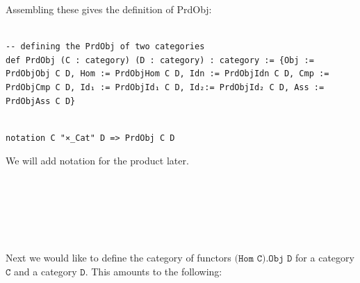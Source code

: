 \documentclass{book}
\newcounter{lcounter}
\newcounter{sectioncount}
\newcounter{subsectioncount}
\renewcommand{\section}[1]{\newpage
\ \\
\ \\
 \begin{center} \scalebox{1.5}{\texttt{\thesectioncount . #1}} \setcounter{sectioncount}{\thesectioncount+1} \setcounter{subsectioncount}{1} \end{center}
 \begin{center}

\ \\
\ \\

\thispagestyle{empty}
\end{center}
}
\begin{document}
Assembling these gives the definition of PrdObj:\\
 
\begin{center}
\begin{tcolorbox}[width=5in,colback={white},title={\begin{center}\texttt{Lean \thelcounter} \addtocounter{lcounter}{1}  \end{center}},colbacktitle=Blue,coltitle=black]
\begin{verbatim}

-- defining the PrdObj of two categories
def PrdObj (C : category) (D : category) : category := {Obj := PrdObjObj C D, Hom := PrdObjHom C D, Idn := PrdObjIdn C D, Cmp := PrdObjCmp C D, Id₁ := PrdObjId₁ C D, Id₂:= PrdObjId₂ C D, Ass := PrdObjAss C D}

\end{verbatim}%
\end{tcolorbox}
\end{center}

\begin{center}
\begin{tcolorbox}[width=5in,colback={white},title={\begin{center}\texttt{Lean \thelcounter} \addtocounter{lcounter}{1}  \end{center}},colbacktitle=Blue,coltitle=black]
\begin{verbatim}

notation C "⨯_Cat" D => PrdObj C D

\end{verbatim}%
\end{tcolorbox}
\end{center}

We will add notation for the product later. 


\section{\texttt{(Hom C).Obj D}}

Next we would like to define the category of functors $\texttt{(Hom C).Obj D}$ for a category $\texttt{C}$ and a category $\texttt{D}$. This amounts to the following:\\
\end{document}
